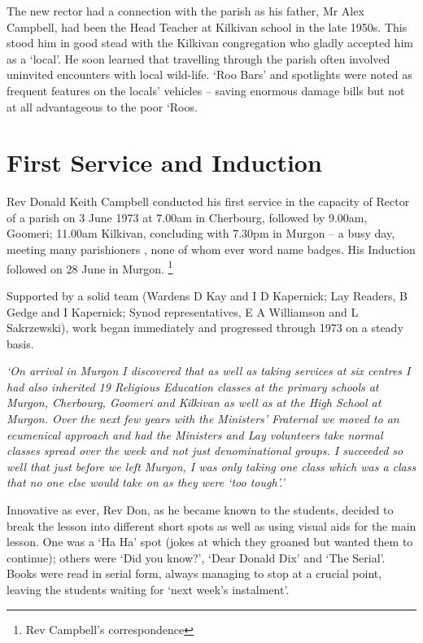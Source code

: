 The new rector had a connection with the parish as his father, Mr Alex Campbell, had been the Head Teacher at Kilkivan school in the late 1950s. This stood him in good stead with the Kilkivan congregation who gladly accepted him as a `local'. He soon learned that travelling through the parish often involved uninvited encounters with local wild-life. `Roo Bars' and spotlights were noted as frequent features on the locals' vehicles -- saving enormous damage bills but not at all advantageous to the poor `Roos.

\hypertarget{first-service-and-induction}{%
\section{First Service and Induction}\label{first-service-and-induction}}

Rev Donald Keith Campbell conducted his first service in the capacity of Rector of a parish on 3 June 1973 at 7.00am in Cherbourg, followed by 9.00am, Goomeri; 11.00am Kilkivan, concluding with 7.30pm in Murgon -- a busy day, meeting many parishioners , none of whom ever word name badges. His Induction followed on 28 June in Murgon. \footnote{Rev Campbell's correspondence}

Supported by a solid team (Wardens D Kay and I D Kapernick; Lay Readers, B Gedge and I Kapernick; Synod representatives, E A Williamson and L Sakrzewski), work began immediately and progressed through 1973 on a steady basis.

\emph{`On arrival in Murgon I discovered that as well as taking services at six centres I had also inherited 19 Religious Education classes at the primary schools at Murgon, Cherbourg, Goomeri and Kilkivan as well as at the High School at Murgon. Over the next few years with the Ministers' Fraternal we moved to an ecumenical approach and had the Ministers and Lay volunteers take normal classes spread over the week and not just denominational groups. I succeeded so well that just before we left Murgon, I was only taking one class which was a class that no one else would take on as they were `too tough'.'}

Innovative as ever, Rev Don, as he became known to the students, decided to break the lesson into different short spots as well as using visual aids for the main lesson. One was a `Ha Ha' spot (jokes at which they groaned but wanted them to continue); others were `Did you know?', `Dear Donald Dix' and `The Serial'. Books were read in serial form, always managing to stop at a crucial point, leaving the students waiting for `next week's instalment'.

